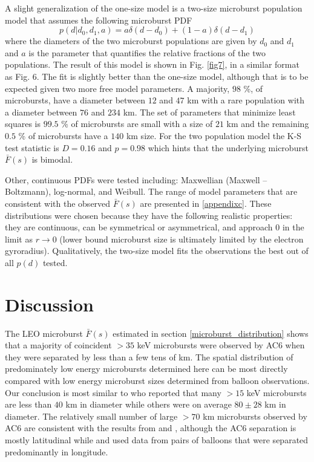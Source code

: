\documentclass[draft]{agujournal2019}
\begin{document}
A slight generalization of the one-size model is a two-size microburst population model that assumes the following microburst PDF
\begin{equation}
p(d | d_0, d_1, a) = a \delta(d-d_0) + (1-a)\delta(d-d_1)
\end{equation} where the diameters of the two microburst populations are given by $d_0$ and $d_1$ and $a$ is the parameter that quantifies the relative fractions of the two populations. The result of this model is shown in Fig. \ref{fig7}, in a similar format as Fig. 6. The fit is slightly better than the one-size model, although that is to be expected given two more free model parameters. A majority, $98$ \%, of microbursts, have a diameter between $12$ and $47$ km with a rare population with a diameter between $76$ and $234$ km. The set of parameters that minimize least squares is $99.5$ \% of microbursts are small with a size of $21$ km and the remaining $0.5$ \% of microbursts have a $140$ km size. For the two population model the K-S test statistic is $D = 0.16$ and $p = 0.98$ which hints that the underlying microburst $\bar{F}(s)$ is bimodal.


Other, continuous PDFs were tested including: Maxwellian (Maxwell -- Boltzmann), log-normal, and Weibull. The range of model parameters that are consistent with the observed $\bar{F}(s)$ are presented in \ref{appendixc}. These distributions were chosen because they have the following realistic properties: they are continuous, can be symmetrical or asymmetrical, and approach 0 in the limit as $r \rightarrow 0$ (lower bound microburst size is ultimately limited by the electron gyroradius). Qualitatively, the two-size model fits the observations the best out of all $p(d)$ tested.

\section{Discussion} \label{discussion}
The LEO microburst $\bar{F}(s)$ estimated in section \ref{microburst_distribution} shows that a majority of coincident $>35$ keV microbursts were observed by AC6 when they were separated by less than a few tens of km. The spatial distribution of predominately low energy microbursts determined here can be most directly compared with low energy microburst sizes determined from balloon observations. Our conclusion is most similar to  who reported that many $> 15$ keV microbursts are less than $40$ km in diameter while others were on average $80 \pm 28$ km in diameter. The relatively small number of large $> 70$ km microbursts observed by AC6 are consistent with the results from  and , although the AC6 separation is mostly latitudinal while  and  used data from pairs of balloons that were separated predominantly in longitude. 
\end{document}
